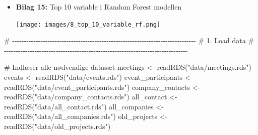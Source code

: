 \documentclass[
  11pt,
  letterpaper,
  DIV=11,
  numbers=noendperiod]{scrartcl}
\newenvironment{Shaded}{\begin{snugshade}}{\end{snugshade}}
\newcommand{\CommentTok}[1]{\textcolor[rgb]{0.37,0.37,0.37}{#1}}
\newcommand{\FunctionTok}[1]{\textcolor[rgb]{0.28,0.35,0.67}{#1}}
\newcommand{\NormalTok}[1]{\textcolor[rgb]{0.00,0.23,0.31}{#1}}
\newcommand{\OtherTok}[1]{\textcolor[rgb]{0.00,0.23,0.31}{#1}}
\newcommand{\StringTok}[1]{\textcolor[rgb]{0.13,0.47,0.30}{#1}}
\begin{document}
\begin{itemize}
\begin{center}
  \end{center}
\item
  \textbf{Bilag 15:} Top 10 variable i Random Forest modellen
  \begin{center}
  \texttt{[image: images/8\_top\_10\_variable\_rf.png]}
  \end{center}
\end{itemize}

\newpage

\begin{Shaded}
\begin{Highlighting}[]
\CommentTok{\# {-}{-}{-}{-}{-}{-}{-}{-}{-}{-}{-}{-}{-}{-}{-}{-}{-}{-}{-}{-}{-}{-}{-}{-}{-}{-}{-}{-}{-}{-}{-}{-}{-}{-}{-}{-}{-}{-}{-}{-}{-}{-}{-}{-}{-}{-}{-}{-}{-}{-}{-}{-}{-}{-}{-}{-}{-}{-}{-}{-}{-}{-}{-}{-}{-}{-}{-}{-}{-}{-}{-}{-}{-}{-}{-}{-}{-}{-}}
\CommentTok{\# 1. Load data}
\CommentTok{\# {-}{-}{-}{-}{-}{-}{-}{-}{-}{-}{-}{-}{-}{-}{-}{-}{-}{-}{-}{-}{-}{-}{-}{-}{-}{-}{-}{-}{-}{-}{-}{-}{-}{-}{-}{-}{-}{-}{-}{-}{-}{-}{-}{-}{-}{-}{-}{-}{-}{-}{-}{-}{-}{-}{-}{-}{-}{-}{-}{-}{-}{-}{-}{-}{-}{-}{-}{-}{-}{-}{-}{-}{-}{-}{-}{-}{-}{-}}

\CommentTok{\# Indlæser alle nødvendige datasæt}
\NormalTok{meetings }\OtherTok{\textless{}{-}} \FunctionTok{readRDS}\NormalTok{(}\StringTok{"data/meetings.rds"}\NormalTok{)}
\NormalTok{events }\OtherTok{\textless{}{-}} \FunctionTok{readRDS}\NormalTok{(}\StringTok{"data/events.rds"}\NormalTok{)}
\NormalTok{event\_participants }\OtherTok{\textless{}{-}} \FunctionTok{readRDS}\NormalTok{(}\StringTok{"data/event\_participants.rds"}\NormalTok{)}
\NormalTok{company\_contacts }\OtherTok{\textless{}{-}} \FunctionTok{readRDS}\NormalTok{(}\StringTok{"data/company\_contacts.rds"}\NormalTok{)}
\NormalTok{all\_contact }\OtherTok{\textless{}{-}} \FunctionTok{readRDS}\NormalTok{(}\StringTok{"data/all\_contact.rds"}\NormalTok{)}
\NormalTok{all\_companies }\OtherTok{\textless{}{-}} \FunctionTok{readRDS}\NormalTok{(}\StringTok{"data/all\_companies.rds"}\NormalTok{)}
\NormalTok{old\_projects }\OtherTok{\textless{}{-}} \FunctionTok{readRDS}\NormalTok{(}\StringTok{"data/old\_projects.rds"}\NormalTok{)}
\end{Highlighting}
\end{Shaded}
\end{document}
